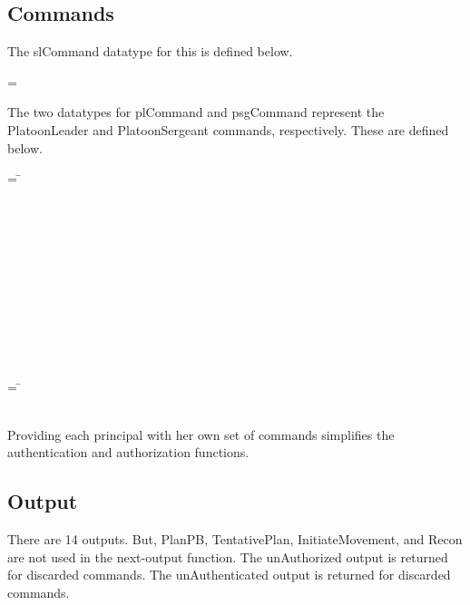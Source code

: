 \documentclass[../../main/main.tex]{subfiles}
\begin{document}
\subsection{Commands}
The slCommand datatype for this  is defined below.

 =   \HOLTokenBar{}  

The two datatypes for plCommand and psgCommand represent the PlatoonLeader and PlatoonSergeant commands, respectively. These are defined below.

\begin{tabbing}
\parskip=8pt
 = \= \\
					     \>\HOLTokenBar{}  \\
					     \>\HOLTokenBar{}  \\
					     \>\HOLTokenBar{} \\
          				     \>\HOLTokenBar{}  \\
				     	     \>\HOLTokenBar{}  \\
					     \>\HOLTokenBar{}  \\
					     \>\HOLTokenBar{}  \\
					     \>\HOLTokenBar{} \\
          				     \>\HOLTokenBar{}  \\
				     	     \>\HOLTokenBar{}  \\
					     \>\HOLTokenBar{} 
\parskip=18pt
\end{tabbing}

\begin{tabbing}
\parskip=8pt
 = \= \\
						\>\HOLTokenBar{} \\
           					\>\HOLTokenBar{} 
\parskip=18pt
\end{tabbing}

Providing each principal with her own set of commands simplifies the authentication and authorization functions.
\subsection{Output}
There are 14 outputs.  But, PlanPB, TentativePlan, InitiateMovement, and Recon are not used in the next-output function.  The unAuthorized output is returned for discarded commands.  The unAuthenticated output is returned for discarded commands.
\end{document}
